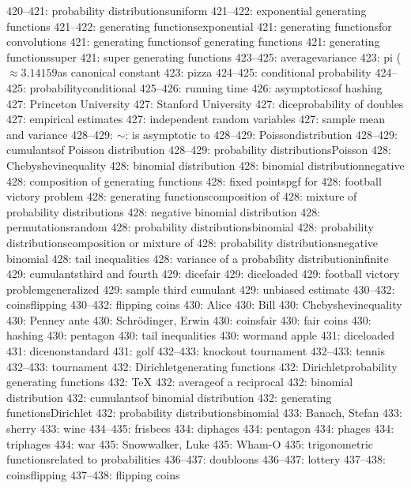 420--421: probability distributions\sub uniform
421--422: exponential generating functions
421--422: generating functions\sub exponential
421: generating functions\sub for convolutions
421: generating functions\sub of generating functions
421: generating functions\sub super
421: super generating functions
423--425: average\sub variance
423: pi ($\approx3.14159$\sub as canonical constant
423: pizza
424--425: conditional probability
424--425: probability\sub conditional
425--426: running time
426: asymptotics\sub of hashing
427: Princeton University
427: Stanford University
427: dice\sub probability of doubles
427: empirical estimates
427: independent random variables
427: sample mean and variance
428--429: $\sim$: is asymptotic to
428--429: Poisson\sub distribution
428--429: cumulants\sub of Poisson distribution
428--429: probability distributions\sub Poisson
428: Chebyshev\sub inequality
428: binomial distribution
428: binomial distribution\sub negative
428: composition of generating functions
428: fixed points\sub pgf for
428: football victory problem
428: generating functions\sub composition of
428: mixture of probability distributions
428: negative binomial distribution
428: permutations\sub random
428: probability distributions\sub binomial
428: probability distributions\sub composition or mixture of
428: probability distributions\sub negative binomial
428: tail inequalities
428: variance of a probability distribution\sub infinite
429: cumulants\sub third and fourth
429: dice\sub fair
429: dice\sub loaded
429: football victory problem\sub generalized
429: sample third cumulant
429: unbiased estimate
430--432: coins\sub flipping
430--432: flipping coins
430: Alice
430: Bill
430: Chebyshev\sub inequality
430: Penney ante
430: Schr\"odinger, Erwin
430: coins\sub fair
430: fair coins
430: hashing
430: pentagon
430: tail inequalities
430: worm\sub and apple
431: dice\sub loaded
431: dice\sub nonstandard
431: golf
432--433: knockout tournament
432--433: tennis
432--433: tournament
432: Dirichlet\sub generating functions
432: Dirichlet\sub probability generating functions
432: \TeX
432: average\sub of a reciprocal
432: binomial distribution
432: cumulants\sub of binomial distribution
432: generating functions\sub Dirichlet
432: probability distributions\sub binomial
433: Banach, Stefan
433: sherry
433: wine
434--435: frisbees
434: diphages
434: pentagon
434: phages
434: triphages
434: war
435: Snowwalker, Luke
435: Wham-O
435: trigonometric functions\sub related to probabilities
436--437: doubloons
436--437: lottery
437--438: coins\sub flipping
437--438: flipping coins
